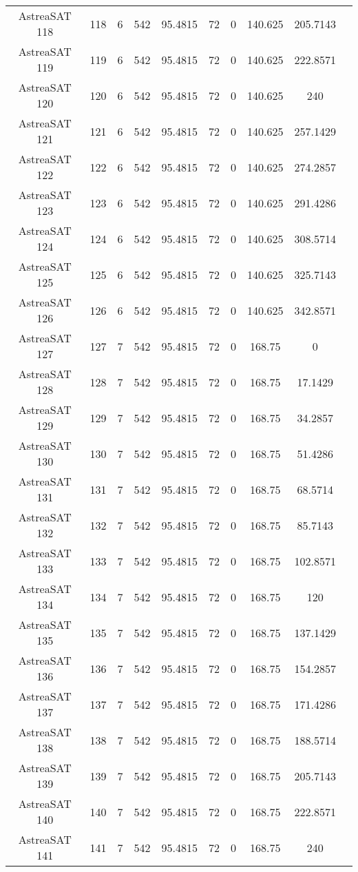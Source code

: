 \begin{longtable}{| c | c | c | c | c | c | c | c | c | c |}
AstreaSAT 118 & 118 & 6 & 542 & 95.4815 & 72 & 0 & 140.625 & 205.7143 \\ 
AstreaSAT 119 & 119 & 6 & 542 & 95.4815 & 72 & 0 & 140.625 & 222.8571 \\ 
AstreaSAT 120 & 120 & 6 & 542 & 95.4815 & 72 & 0 & 140.625 & 240 \\ 
AstreaSAT 121 & 121 & 6 & 542 & 95.4815 & 72 & 0 & 140.625 & 257.1429 \\ 
AstreaSAT 122 & 122 & 6 & 542 & 95.4815 & 72 & 0 & 140.625 & 274.2857 \\ 
AstreaSAT 123 & 123 & 6 & 542 & 95.4815 & 72 & 0 & 140.625 & 291.4286 \\ 
AstreaSAT 124 & 124 & 6 & 542 & 95.4815 & 72 & 0 & 140.625 & 308.5714 \\ 
AstreaSAT 125 & 125 & 6 & 542 & 95.4815 & 72 & 0 & 140.625 & 325.7143 \\ 
AstreaSAT 126 & 126 & 6 & 542 & 95.4815 & 72 & 0 & 140.625 & 342.8571 \\ 
AstreaSAT 127 & 127 & 7 & 542 & 95.4815 & 72 & 0 & 168.75 & 0 \\ 
AstreaSAT 128 & 128 & 7 & 542 & 95.4815 & 72 & 0 & 168.75 & 17.1429 \\ 
AstreaSAT 129 & 129 & 7 & 542 & 95.4815 & 72 & 0 & 168.75 & 34.2857 \\ 
AstreaSAT 130 & 130 & 7 & 542 & 95.4815 & 72 & 0 & 168.75 & 51.4286 \\ 
AstreaSAT 131 & 131 & 7 & 542 & 95.4815 & 72 & 0 & 168.75 & 68.5714 \\ 
AstreaSAT 132 & 132 & 7 & 542 & 95.4815 & 72 & 0 & 168.75 & 85.7143 \\ 
AstreaSAT 133 & 133 & 7 & 542 & 95.4815 & 72 & 0 & 168.75 & 102.8571 \\ 
AstreaSAT 134 & 134 & 7 & 542 & 95.4815 & 72 & 0 & 168.75 & 120 \\ 
AstreaSAT 135 & 135 & 7 & 542 & 95.4815 & 72 & 0 & 168.75 & 137.1429 \\ 
AstreaSAT 136 & 136 & 7 & 542 & 95.4815 & 72 & 0 & 168.75 & 154.2857 \\ 
AstreaSAT 137 & 137 & 7 & 542 & 95.4815 & 72 & 0 & 168.75 & 171.4286 \\ 
AstreaSAT 138 & 138 & 7 & 542 & 95.4815 & 72 & 0 & 168.75 & 188.5714 \\ 
AstreaSAT 139 & 139 & 7 & 542 & 95.4815 & 72 & 0 & 168.75 & 205.7143 \\ 
AstreaSAT 140 & 140 & 7 & 542 & 95.4815 & 72 & 0 & 168.75 & 222.8571 \\ 
AstreaSAT 141 & 141 & 7 & 542 & 95.4815 & 72 & 0 & 168.75 & 240 \\ 

\end{longtable}
